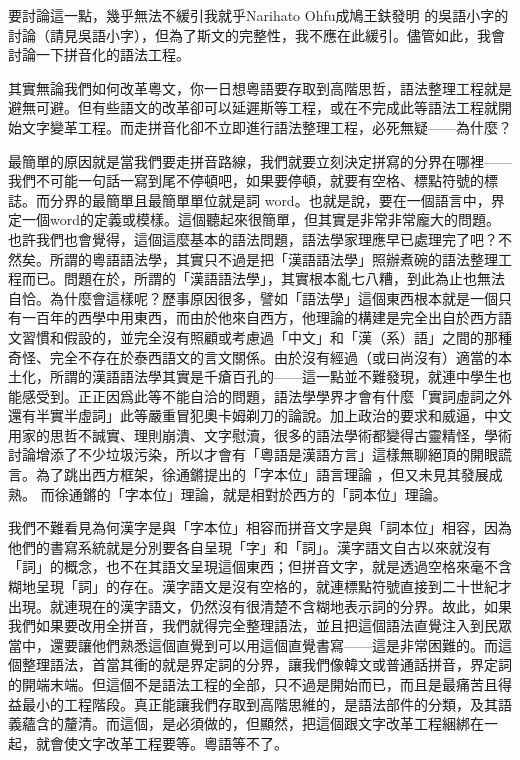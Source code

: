\documentclass[a5paper, 10pt, openany]{book} %
\begin{document}
要討論這一點，幾乎無法不緩引我就乎Narihato Ohfu成鳩王鈇發明 的吳語小字的討論（請見吳語小字），但為了斯文的完整性，我不應在此緩引。儘管如此，我會討論一下拼音化的語法工程。

其實無論我們如何改革粵文，你一日想粵語要存取到高階思哲，語法整理工程就是避無可避。但有些語文的改革卻可以延遲斯等工程，或在不完成此等語法工程就開始文字變革工程。而走拼音化卻不立即進行語法整理工程，必死無疑——為什麼？

最簡單的原因就是當我們要走拼音路線，我們就要立刻決定拼寫的分界在哪裡——我們不可能一句話一寫到尾不停頓吧，如果要停頓，就要有空格、標點符號的標誌。而分界的最簡單且最簡單單位就是詞 word。也就是說，要在一個語言中，界定一個word的定義或模樣。這個聽起來很簡單，但其實是非常非常龐大的問題。也許我們也會覺得，這個這麼基本的語法問題，語法學家理應早已處理完了吧？不然矣。所謂的粵語語法學，其實只不過是把「漢語語法學」照辦煮碗的語法整理工程而已。問題在於，所謂的「漢語語法學」，其實根本亂七八糟，到此為止也無法自恰。為什麼會這樣呢？歷事原因很多，譬如「語法學」這個東西根本就是一個只有一百年的西學中用東西，而由於他來自西方，他理論的構建是完全出自於西方語文習慣和假設的，並完全沒有照顧或考慮過「中文」和「漢（系）語」之間的那種奇怪、完全不存在於泰西語文的言文關係。由於沒有經過（或曰尚沒有）適當的本土化，所謂的漢語語法學其實是千瘡百孔的——這一點並不難發現，就連中學生也能感受到。正正因爲此等不能自洽的問題，語法學學界才會有什麼「實詞虛詞之外還有半實半虛詞」此等嚴重冒犯奧卡姆剃刀的論說。加上政治的要求和威逼，中文用家的思哲不誠實、理則崩潰、文字慰瀆，很多的語法學術都變得古靈精怪，學術討論增添了不少垃圾污染，所以才會有「粵語是漢語方言」這樣無聊絕頂的開眼謊言。為了跳出西方框架，徐通鏘提出的「字本位」語言理論 ，但又未見其發展成熟。 而徐通鏘的「字本位」理論，就是相對於西方的「詞本位」理論。

我們不難看見為何漢字是與「字本位」相容而拼音文字是與「詞本位」相容，因為他們的書寫系統就是分別要各自呈現「字」和「詞」。漢字語文自古以來就沒有「詞」的概念，也不在其語文呈現這個東西；但拼音文字，就是透過空格來毫不含糊地呈現「詞」的存在。漢字語文是沒有空格的，就連標點符號直接到二十世紀才出現。就連現在的漢字語文，仍然沒有很清楚不含糊地表示詞的分界。故此，如果我們如果要改用全拼音，我們就得完全整理語法，並且把這個語法直覺注入到民眾當中，還要讓他們熟悉這個直覺到可以用這個直覺書寫——這是非常困難的。而這個整理語法，首當其衝的就是界定詞的分界，讓我們像韓文或普通話拼音，界定詞的開端末端。但這個不是語法工程的全部，只不過是開始而已，而且是最痛苦且得益最小的工程階段。真正能讓我們存取到高階思維的，是語法部件的分類，及其語義蘊含的釐清。而這個，是必須做的，但顯然，把這個跟文字改革工程綑綁在一起，就會使文字改革工程要等。粵語等不了。
\end{document}
